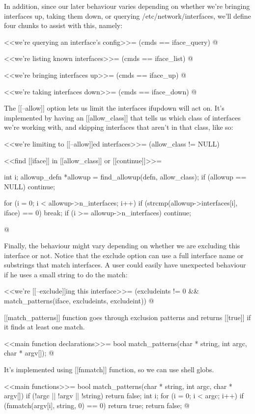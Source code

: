 \documentclass{article}
\begin{document}
In addition, since our later behaviour varies depending on whether we're
bringing interfaces up, taking them down, or querying /etc/network/interfaces,
we'll define four chunks to assist with this, namely:

<<we're querying an interface's config>>=
(cmds == iface_query)
@

<<we're listing known interfaces>>=
(cmds == iface_list)
@

<<we're bringing interfaces up>>=
(cmds == iface_up)
@

<<we're taking interfaces down>>=
(cmds == iface_down)
@

The [[--allow]] option lets us limit the interfaces ifupdown will act on.
It's implemented by having an [[allow_class]] that tells us which class
of interfaces we're working with, and skipping interfaces that aren't
in that class, like so:

<<we're limiting to [[--allow]]ed interfaces>>=
(allow_class != NULL)

<<find [[iface]] in [[allow_class]] or [[continue]]>>=
{
	int i;
	allowup_defn *allowup = find_allowup(defn, allow_class);
	if (allowup == NULL)
		continue;

	for (i = 0; i < allowup->n_interfaces; i++) {
		if (strcmp(allowup->interfaces[i], iface) == 0)
			break;
	}
	if (i >= allowup->n_interfaces)
		continue;
}
@

Finally, the behaviour might vary depending on whether we are 
excluding this interface or not. Notice that
the exclude option can use a full interface name or substrings that
match interfaces. A user could easily have unexpected behaviour
if he uses a small string to do the match:

<<we're [[--exclude]]ing this interface>>=
(excludeints != 0 && match_patterns(iface, excludeints, excludeint))
@

[[match_patterns]] function goes through exclusion patterns and returns [[true]] if it finds at least one match.

<<main function declarations>>=
bool match_patterns(char * string, int argc, char * argv[]);
@

It's implemented using [[fnmatch]] function, so we can use shell globs.

<<main functions>>=
bool match_patterns(char * string, int argc, char * argv[]) {
	if (!argc || !argv || !string) return false;
	int i;
	for (i = 0; i < argc; i++) {
		if (fnmatch(argv[i], string, 0) == 0) {
			return true;
		}
	}
	return false;
}
@
\end{document}
